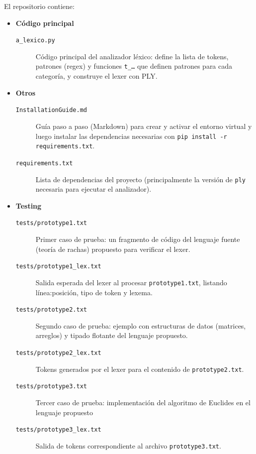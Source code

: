 \documentclass{article}
\begin{document}
El repositorio contiene:
\begin{itemize}
  \item \textbf{Código principal}
  \begin{description}
    \item[\texttt{a\_lexico.py}] Código principal del analizador léxico: 
      define la lista de tokens, patrones (regex) y funciones \texttt{t\_…} que definen patrones
      para cada categoría, y construye el lexer con PLY.
  \end{description}

  \item \textbf{Otros}
  \begin{description}
    \item[\texttt{InstallationGuide.md}] Guía paso a paso (Markdown) para crear y 
      activar el entorno virtual y luego instalar las dependencias necesarias con 
      \texttt{pip install -r requirements.txt}.
    \item[\texttt{requirements.txt}] Lista de dependencias del proyecto 
      (principalmente la versión de \texttt{ply} necesaria para ejecutar el analizador).
  \end{description}

  \item \textbf{Testing}
  \begin{description}
    \item[\texttt{tests/prototype1.txt}] Primer caso de prueba: un 
      fragmento de código del lenguaje fuente (teoría de rachas) propuesto para verificar el lexer.
    \item[\texttt{tests/prototype1\_lex.txt}] Salida esperada del lexer al 
        procesar \texttt{prototype1.txt}, listando línea:posición, tipo de token y lexema.
    \item[\texttt{tests/prototype2.txt}] Segundo caso de prueba: ejemplo con estructuras de 
        datos (matrices, arreglos) y tipado flotante del lenguaje propuesto.
    \item[\texttt{tests/prototype2\_lex.txt}] Tokens generados por el lexer para el contenido 
        de \texttt{prototype2.txt}.
    \item[\texttt{tests/prototype3.txt}] Tercer caso de prueba: implementación 
        del algoritmo de Euclides en el lenguaje propuesto
    \item[\texttt{tests/prototype3\_lex.txt}] Salida de tokens correspondiente al 
        archivo \texttt{prototype3.txt}.
  \end{description}
\end{itemize}
\end{document}

